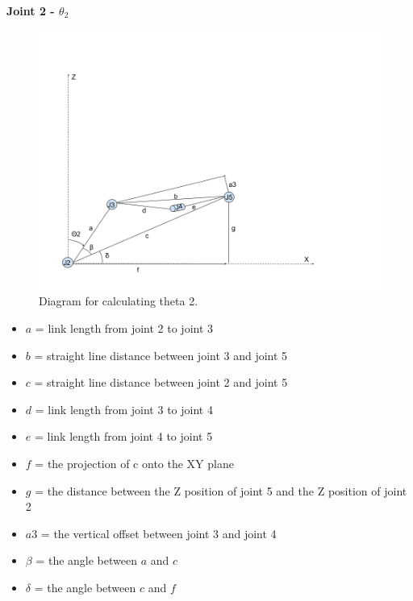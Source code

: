 \documentclass{article}
\begin{document}
\paragraph{Joint 2 - $\theta _2$}
\begin{figure}[H]
    \includegraphics[width=\linewidth]{theta2.png}
    \caption{Diagram for calculating theta 2.}
    \label{fig:theta3}
\end{figure}
\begin{itemize}
    \item $a$ = link length from joint 2 to joint 3
    \item $b$ = straight line distance between joint 3 and joint 5
    \item $c$ = straight line distance between joint 2 and joint 5
    \item $d$ = link length from joint 3 to joint 4
    \item $e$ = link length from joint 4 to joint 5
    \item $f$ = the projection of c onto the XY plane
    \item $g$ = the distance between the Z position of joint 5 and the Z position of joint 2
    \item $a3$ = the vertical offset between joint 3 and joint 4
    \item $\beta$ = the angle between $a$ and $c$
    \item $\delta$ = the angle between $c$ and $f$
\end{itemize}
\end{document}
